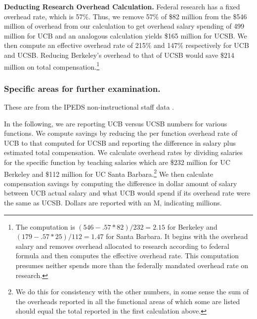 \documentclass[11pt]{article}
\begin{document}

{\bf Deducting Research Overhead Calculation.} Federal research has a
fixed overhead rate, which is 57\%.  Thus, we remove 57\% of \$82
million from the \$546 million of overhead from our calculation to get
overhead salary spending of 499 million for UCB and an analogous
calculation yields \$165 million for UCSB.  We then compute an effective
overhead rate of 215\% and 147\% respectively for UCB and UCSB.
Reducing Berkeley's overhead to that of UCSB would save \$214 million
on total compensation.\footnote{The computation is $(546 - .57*82)/232 = 2.15$
for Berkeley and $(179 - .57*25)/112 = 1.47$ for Santa Barbara. It begins
with the overhead salary and removes overhead allocated to research
according to federal formula and then computes the effective overhead
rate. This computation presumes neither spends more than the federally
mandated overhead rate on research.}


\subsubsection{Specific areas for further examination.}

These are from the IPEDS non-instructional staff data
\cite{ipeds-nis}.  

In the following, we are reporting UCB versus UCSB numbers for various
functions.  We compute savings by reducing the per function overhead
rate of UCB to that computed for UCSB and reporting the difference in
salary plus estimated total compensation.  We calculate overhead rates
by dividing salaries for the specific function by teaching
salaries which are \$232  million for UC Berkeley and \$112 million for
UC Santa Barbara.\footnote{We do this for consistency with the other
  numbers, in some sense the sum of the overheads reported in all the
  functional areas of which some are listed should equal the total
  reported in the first calculation above.}  We then calculate compensation savings
by computing the difference in dollar amount of salary
between UCB actual salary and what UCB would spend if its
overhead rate were the same as UCSB.  Dollars are reported
with an M, indicating millions.
\end{document}
